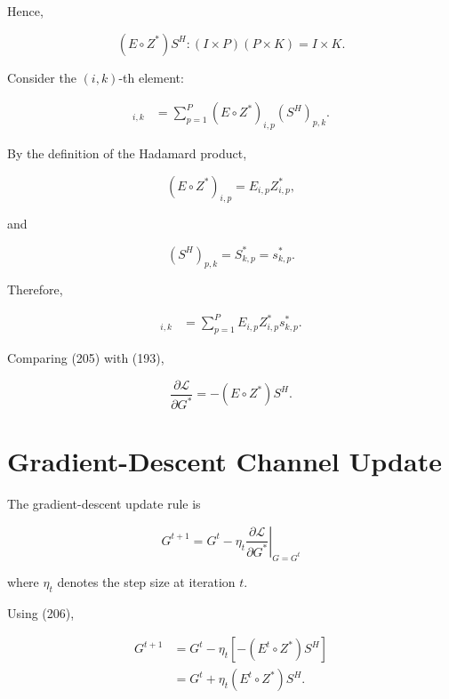 \documentclass[12pt,a4paper]{article}
\begin{document}
Hence,

\begin{equation}
(E\circ Z^{*})S^{H}
:
(I\times P)(P\times K)
=
I\times K.
\tag{201}
\end{equation}

Consider the $(i,k)$-th element:

\begin{align}
[(E\circ Z^{*})S^{H}]_{i,k}
&=
\sum_{p=1}^{P}
(E\circ Z^{*})_{i,p}
(S^{H})_{p,k}.
\tag{202}
\end{align}

By the definition of the Hadamard product,

\begin{equation}
(E\circ Z^{*})_{i,p}
=
E_{i,p}Z_{i,p}^{*},
\tag{203}
\end{equation}

and

\begin{equation}
(S^{H})_{p,k}
=
S_{k,p}^{*}
=
s_{k,p}^{*}.
\tag{204}
\end{equation}

Therefore,

\begin{align}
[(E\circ Z^{*})S^{H}]_{i,k}
&=
\sum_{p=1}^{P}
E_{i,p}
Z_{i,p}^{*}
s_{k,p}^{*}.
\tag{205}
\end{align}

Comparing (205) with (193),

\begin{equation}
\boxed{
\frac{\partial\mathcal{L}}
{\partial G^{*}}
=
-(E\circ Z^{*})S^{H}
}.
\tag{206}
\end{equation}

\section{Gradient-Descent Channel Update}

The gradient-descent update rule is

\begin{equation}
\boxed{
G^{t+1}
=
G^{t}
-
\eta_t
\left.
\frac{\partial\mathcal{L}}
{\partial G^{*}}
\right|_{G=G^{t}}
}
\tag{207}
\end{equation}

where $\eta_t$ denotes the step size at iteration $t$.

Using (206),

\begin{align}
G^{t+1}
&=
G^{t}
-
\eta_t
\left[
-(E^{t}\circ Z^{*})S^{H}
\right]
\nonumber\\
&=
G^{t}
+
\eta_t
(E^{t}\circ Z^{*})S^{H}.
\tag{208}
\end{align}
\end{document}
